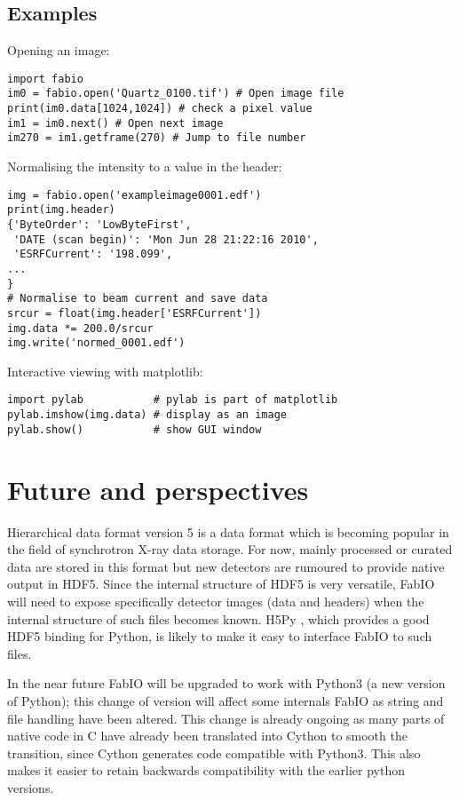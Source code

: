 \documentclass[preprint ]{iucr}
\begin{document}
\subsection{Examples}

Opening an image:

\begin{verbatim}
import fabio     
im0 = fabio.open('Quartz_0100.tif') # Open image file
print(im0.data[1024,1024]) # check a pixel value
im1 = im0.next() # Open next image
im270 = im1.getframe(270) # Jump to file number
\end{verbatim}

Normalising the intensity to a value in the header:

\begin{verbatim}
img = fabio.open('exampleimage0001.edf')
print(img.header)
{'ByteOrder': 'LowByteFirst',
 'DATE (scan begin)': 'Mon Jun 28 21:22:16 2010',
 'ESRFCurrent': '198.099',
...
}
# Normalise to beam current and save data
srcur = float(img.header['ESRFCurrent'])
img.data *= 200.0/srcur
img.write('normed_0001.edf')
\end{verbatim}

Interactive viewing with matplotlib:

\begin{verbatim}
import pylab           # pylab is part of matplotlib
pylab.imshow(img.data) # display as an image
pylab.show()           # show GUI window
\end{verbatim}


\section{Future and perspectives}

Hierarchical data format version 5 \cite{hdf5} is a data format which is
becoming popular in the field of synchrotron X-ray data storage. 
For now, mainly processed or curated data are stored in this format but 
new detectors are rumoured to provide native output in HDF5.
Since the internal structure of HDF5 is very versatile, FabIO will need to expose 
specifically detector images (data and headers) when the internal structure 
of such files becomes known. 
H5Py \cite{h5py}, which provides a good HDF5 binding for Python, is likely to
make it easy to interface FabIO to such files.

In the near future FabIO will be upgraded to work with Python3 (a new version of 
Python); this change of version will affect some internals FabIO as string and 
file handling have been altered.
This change is already ongoing as many parts of native code in C have already
been translated into Cython \cite{cython} to smooth the transition, since 
Cython generates code compatible with Python3. 
This also makes it easier to retain backwards compatibility with the earlier
python versions. %
\end{document}
